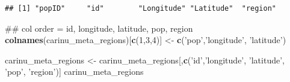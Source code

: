 \documentclass[]{article}
\newenvironment{Shaded}{\begin{snugshade}}{\end{snugshade}}
\newcommand{\KeywordTok}[1]{\textcolor[rgb]{0.13,0.29,0.53}{\textbf{#1}}}
\newcommand{\DecValTok}[1]{\textcolor[rgb]{0.00,0.00,0.81}{#1}}
\newcommand{\StringTok}[1]{\textcolor[rgb]{0.31,0.60,0.02}{#1}}
\newcommand{\NormalTok}[1]{#1}
\begin{document}
\begin{verbatim}
## [1] "popID"     "id"        "Longitude" "Latitude"  "region"
\end{verbatim}

\begin{Shaded}
\begin{Highlighting}[]
\NormalTok{## col order  = id, longitude, latitude, pop, region}
\KeywordTok{colnames}\NormalTok{(carinu_meta_regions)[}\KeywordTok{c}\NormalTok{(}\DecValTok{1}\NormalTok{,}\DecValTok{3}\NormalTok{,}\DecValTok{4}\NormalTok{)] <-}\StringTok{ }\KeywordTok{c}\NormalTok{(}\StringTok{'pop'}\NormalTok{,}\StringTok{'longitude'}\NormalTok{, }\StringTok{'latitude'}\NormalTok{)}

\NormalTok{carinu_meta_regions <-}\StringTok{ }\NormalTok{carinu_meta_regions[,}\KeywordTok{c}\NormalTok{(}\StringTok{'id'}\NormalTok{,}\StringTok{'longitude'}\NormalTok{, }\StringTok{'latitude'}\NormalTok{, }\StringTok{'pop'}\NormalTok{, }\StringTok{'region'}\NormalTok{)]}
\NormalTok{carinu_meta_regions}
\end{Highlighting}
\end{Shaded}
\end{document}
